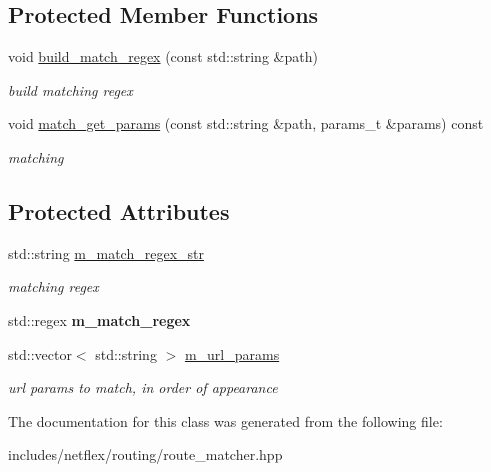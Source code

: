 \subsection*{Protected Member Functions}
\begin{DoxyCompactItemize}
\item 
\mbox{\label{classnetflex_1_1routing_1_1route__matcher_a01bd617a02db70923d6088fa6ab466c5}} 
void \hyperlink{classnetflex_1_1routing_1_1route__matcher_a01bd617a02db70923d6088fa6ab466c5}{build\+\_\+match\+\_\+regex} (const std\+::string \&path)
\begin{DoxyCompactList}\small\item\em build matching regex \end{DoxyCompactList}\item 
\mbox{\label{classnetflex_1_1routing_1_1route__matcher_af2cdb76cebb622b34765cedfbdd46cf2}} 
void \hyperlink{classnetflex_1_1routing_1_1route__matcher_af2cdb76cebb622b34765cedfbdd46cf2}{match\+\_\+get\+\_\+params} (const std\+::string \&path, params\+\_\+t \&params) const
\begin{DoxyCompactList}\small\item\em matching \end{DoxyCompactList}\end{DoxyCompactItemize}
\subsection*{Protected Attributes}
\begin{DoxyCompactItemize}
\item 
\mbox{\label{classnetflex_1_1routing_1_1route__matcher_a3c13952acd046bdf9af2e2a5852ec350}} 
std\+::string \hyperlink{classnetflex_1_1routing_1_1route__matcher_a3c13952acd046bdf9af2e2a5852ec350}{m\+\_\+match\+\_\+regex\+\_\+str}
\begin{DoxyCompactList}\small\item\em matching regex \end{DoxyCompactList}\item 
\mbox{\label{classnetflex_1_1routing_1_1route__matcher_a4968f359373528ec77417b1fe799caf8}} 
std\+::regex {\bfseries m\+\_\+match\+\_\+regex}
\item 
\mbox{\label{classnetflex_1_1routing_1_1route__matcher_a33346356f8d0733e62aeb2986446606c}} 
std\+::vector$<$ std\+::string $>$ \hyperlink{classnetflex_1_1routing_1_1route__matcher_a33346356f8d0733e62aeb2986446606c}{m\+\_\+url\+\_\+params}
\begin{DoxyCompactList}\small\item\em url params to match, in order of appearance \end{DoxyCompactList}\end{DoxyCompactItemize}


The documentation for this class was generated from the following file\+:\begin{DoxyCompactItemize}
\item 
includes/netflex/routing/route\+\_\+matcher.\+hpp\end{DoxyCompactItemize}
